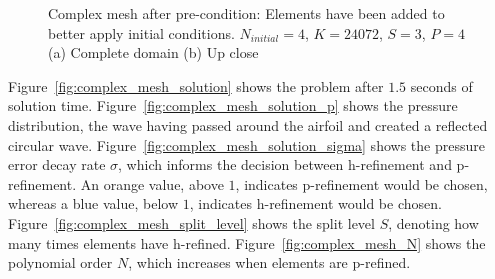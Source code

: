 \begin{figure}[H]
	\centering
	\hfill
	\caption{Complex mesh after pre-condition: Elements have been added to better apply initial conditions. \(N_{initial} = 4\), \(K = 24072\), \(S = 3\), \(P = 4\) (a) Complete domain (b) Up close}\label{fig:complex_mesh_pre_condition}
\end{figure}

Figure~\ref{fig:complex_mesh_solution} shows the problem after \(1.5\) seconds of solution time.
Figure~\ref{fig:complex_mesh_solution_p} shows the pressure distribution, the wave having passed
around the airfoil and created a reflected circular wave.
Figure~\ref{fig:complex_mesh_solution_sigma} shows the pressure error decay rate \(\sigma \), which
informs the decision between h-refinement and p-refinement. An orange value, above \(1\), indicates
p-refinement would be chosen, whereas a blue value, below \(1\), indicates h-refinement would be
chosen. Figure~\ref{fig:complex_mesh_split_level} shows the split level \(S\), denoting how many
times elements have h-refined. Figure~\ref{fig:complex_mesh_N} shows the polynomial order \(N\),
which increases when elements are p-refined.

